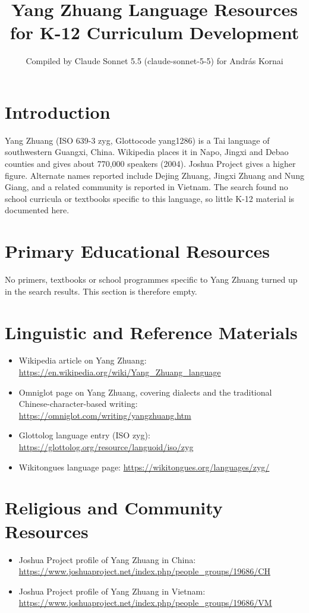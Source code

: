 \documentclass[12pt]{article}
\title{Yang Zhuang Language Resources for K-12 Curriculum Development}
\author{Compiled by Claude Sonnet 5.5 (claude-sonnet-5-5) for Andr\'as Kornai}
\date{}
\begin{document}
\maketitle

\section{Introduction}
Yang Zhuang (ISO 639-3 zyg, Glottocode yang1286) is a Tai language of southwestern Guangxi, China. Wikipedia places it in Napo, Jingxi and Debao counties and gives about 770,000 speakers (2004). Joshua Project gives a higher figure. Alternate names reported include Dejing Zhuang, Jingxi Zhuang and Nung Giang, and a related community is reported in Vietnam. The search found no school curricula or textbooks specific to this language, so little K-12 material is documented here.

\section{Primary Educational Resources}
No primers, textbooks or school programmes specific to Yang Zhuang turned up in the search results. This section is therefore empty.

\section{Linguistic and Reference Materials}
\begin{itemize}
\item Wikipedia article on Yang Zhuang: \url{https://en.wikipedia.org/wiki/Yang_Zhuang_language}
\item Omniglot page on Yang Zhuang, covering dialects and the traditional Chinese-character-based writing: \url{https://omniglot.com/writing/yangzhuang.htm}
\item Glottolog language entry (ISO zyg): \url{https://glottolog.org/resource/languoid/iso/zyg}
\item Wikitongues language page: \url{https://wikitongues.org/languages/zyg/}
\end{itemize}

\section{Religious and Community Resources}
\begin{itemize}
\item Joshua Project profile of Yang Zhuang in China: \url{https://www.joshuaproject.net/index.php/people_groups/19686/CH}
\item Joshua Project profile of Yang Zhuang in Vietnam: \url{https://www.joshuaproject.net/index.php/people_groups/19686/VM}
\end{itemize}
\end{document}
